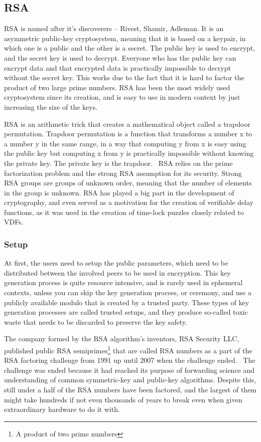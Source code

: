 \subsection{RSA}
RSA is named after it's discoverers – Rivest, Shamir, Adleman. It is an asymmetric public-key cryptosystem, meaning that it is based on a keypair, in which one is a public and the other is a secret. The public key is used to encrypt, and the secret key is used to decrypt. Everyone who has the public key can encrypt data and that encrypted data is practically impossible to decrypt without the secret key. This works due to the fact that it is hard to factor the product of two large prime numbers. RSA has been the most widely used cryptosystem since its creation, and is easy to use in modern context by just increasing the size of the keys.

RSA is an arithmetic trick that creates a mathematical object called a trapdoor permutation. Trapdoor permutation is a function that transforms a number x to a number y in the same range, in a way that computing y from x is easy using the public key but computing x from y is practically impossible without knowing the private key. The private key is the trapdoor.~\cite{Aumasson2018-nh} RSA relies on the prime factorization problem and the strong RSA assumption for its security. Strong RSA groups are groups of unknown order, meaning that the number of elements in the group is unknown. RSA has played a big part in the development of cryptography, and even served as a motivation for the creation of verifiable delay functions, as it was used in the creation of time-lock puzzles closely related to VDFs.

\subsubsection{Setup}
At first, the users need to setup the public parameters, which need to be distributed between the involved peers to be used in encryption. This key generation process is quite resource intensive, and is rarely used in ephemeral contexts, unless you can skip the key generation process, or ceremony, and use a publicly available modulo that is created by a trusted party. These types of key generation processes are called trusted setups, and they produce so-called toxic waste that needs to be discarded to preserve the key safety.

The company formed by the RSA algorithm's inventors, RSA Security LLC, published public RSA semiprimes\footnote{A product of two prime numbers} that are called RSA numbers as a part of the RSA factoring challenge from 1991 up until 2007 when the challenge ended.~\cite{RSA_Laboratories2013-zk} The challenge was ended because it had reached its purpose of forwarding science and understanding of common symmetric-key and public-key algorithms. Despite this, still under a half of the RSA numbers have been factored, and the largest of them might take hundreds if not even thousands of years to break even when given extraordinary hardware to do it with.

